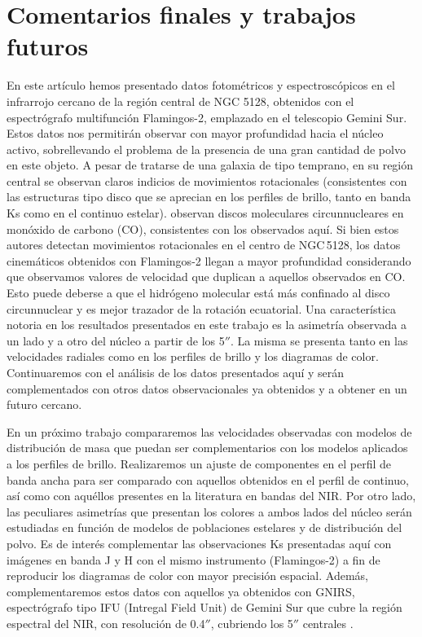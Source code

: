\documentclass[baaa]{baaa}
\begin{document}
\section{Comentarios finales y trabajos futuros}
En este artículo hemos presentado datos fotométricos y espectroscópicos en el  infrarrojo cercano de la región central de NGC 5128, obtenidos con el espectrógrafo multifunción Flamingos-2, emplazado en el telescopio Gemini Sur. Estos datos nos permitirán observar con mayor profundidad hacia el núcleo activo, sobrellevando el problema de la presencia de una gran cantidad de polvo en este objeto. A pesar de tratarse de una galaxia de tipo temprano, en su región central se observan claros indicios de movimientos rotacionales (consistentes con las estructuras tipo disco que se aprecian en los perfiles de brillo, tanto en banda Ks como en el continuo estelar). \citet{Espada} observan discos moleculares circunnucleares en monóxido de carbono (CO), consistentes con los observados aquí. Si bien estos autores detectan movimientos rotacionales en el centro de NGC\,5128, los datos cinemáticos obtenidos con Flamingos-2 llegan a mayor profundidad considerando que observamos valores de velocidad que duplican a aquellos observados en CO. Esto puede deberse a que el hidrógeno molecular está más confinado al disco circunnuclear y es mejor trazador de la rotación ecuatorial. 
Una característica notoria en los resultados presentados en este trabajo es la asimetría observada a un lado y a otro del núcleo a partir de los 5$''$. La misma se presenta tanto en las velocidades radiales como en los perfiles de brillo y los diagramas de color. Continuaremos con el análisis de los datos presentados aquí y serán complementados con otros datos observacionales ya obtenidos y a obtener en un futuro cercano. 

En un próximo trabajo compararemos las velocidades observadas con modelos de distribución de masa que puedan ser complementarios con los modelos aplicados a los perfiles de brillo. 
Realizaremos un ajuste de componentes en el perfil de banda ancha para ser comparado con aquellos obtenidos en el perfil de continuo, así como con aquéllos presentes en la literatura en bandas del NIR. Por otro lado, 
las peculiares asimetrías que presentan los colores a ambos lados del núcleo serán estudiadas en función de modelos de poblaciones estelares y de distribución del polvo. Es de interés complementar las observaciones Ks presentadas aquí con imágenes en banda J y H con el mismo instrumento (Flamingos-2) a fin de reproducir los diagramas de color con mayor precisión espacial. Además, complementaremos estos datos con aquellos ya obtenidos con GNIRS, espectrógrafo tipo IFU (Intregal Field Unit) de Gemini Sur que cubre la región espectral del NIR, con resolución de 0.4$''$, cubriendo los 5$''$ centrales \citep{2021_Diaz}. 
\end{document}
